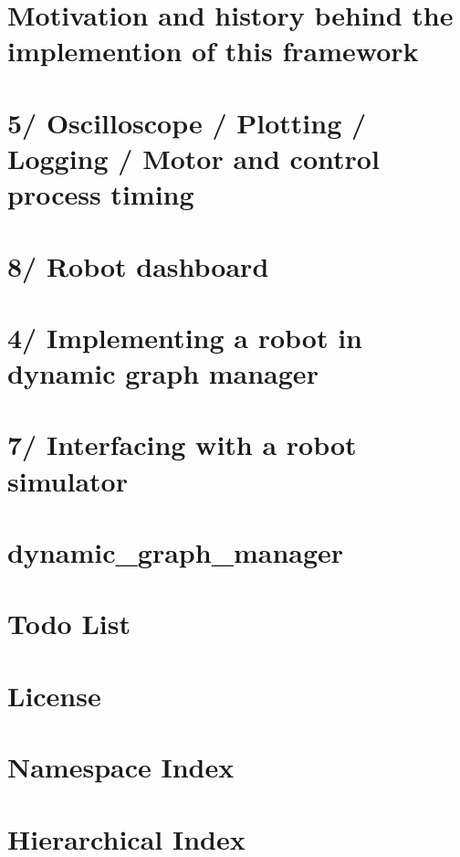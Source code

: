 \documentclass[twoside]{book}
\newcommand{\+}{\discretionary{\mbox{\scriptsize$\hookleftarrow$}}{}{}}
\begin{document}
\chapter{Motivation and history behind the implemention of this framework}
\label{subpage_motivation_history}

\chapter{5/ Oscilloscope / Plotting / Logging / Motor and control process timing}
\label{subpage_plot}

\chapter{8/ Robot dashboard}
\label{subpage_robot_dashboard}

\chapter{4/ Implementing a robot in dynamic graph manager}
\label{subpage_robot_properties}

\chapter{7/ Interfacing with a robot simulator}
\label{subpage_robot_simulation}

\chapter{dynamic\+\_\+graph\+\_\+manager}
\label{md_readme}

\chapter{Todo List}
\label{todo}

\chapter{License}
\label{license}

\chapter{Namespace Index}

\chapter{Hierarchical Index}

\end{document}
